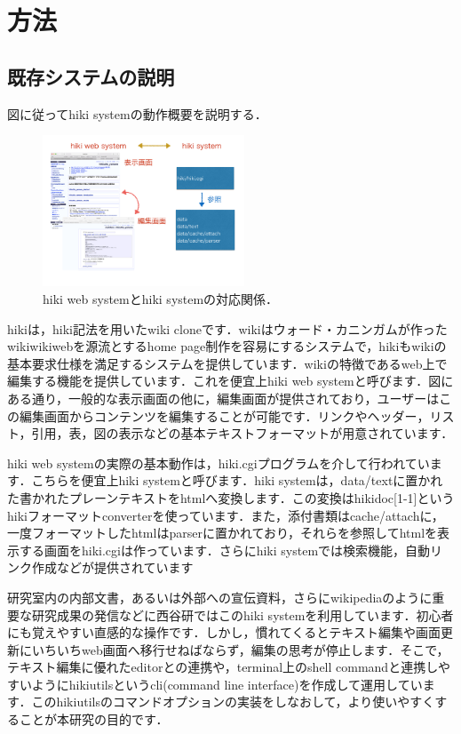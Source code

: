 \section{方法}
\subsection{既存システムの説明}
図に従ってhiki systemの動作概要を説明する．

\begin{figure}[htbp]\begin{center}
\includegraphics[width=6cm,bb=0 0 442 432]{../figs/./hikiutils_yamane_09_copy.001.jpg}
\caption{hiki web systemとhiki systemの対応関係．}
\label{default}\end{center}\end{figure}
hikiは，hiki記法を用いたwiki cloneです．wikiはウォード・カニンガムが作ったwikiwikiwebを源流とするhome page制作を容易にするシステムで，hikiもwikiの基本要求仕様を満足するシステムを提供しています．wikiの特徴であるweb上で編集する機能を提供しています．これを便宜上hiki web systemと呼びます．図にある通り，一般的な表示画面の他に，編集画面が提供されており，ユーザーはこの編集画面からコンテンツを編集することが可能です．リンクやヘッダー，リスト，引用，表，図の表示などの基本テキストフォーマットが用意されています．

hiki web systemの実際の基本動作は，hiki.cgiプログラムを介して行われています．こちらを便宜上hiki systemと呼びます．hiki systemは，data/textに置かれた書かれたプレーンテキストをhtmlへ変換します．この変換はhikidoc[1-1]というhikiフォーマットconverterを使っています．また，添付書類はcache/attachに，一度フォーマットしたhtmlはparserに置かれており，それらを参照してhtmlを表示する画面をhiki.cgiは作っています．さらにhiki systemでは検索機能，自動リンク作成などが提供されています

研究室内の内部文書，あるいは外部への宣伝資料，さらにwikipediaのように重要な研究成果の発信などに西谷研ではこのhiki systemを利用しています．初心者にも覚えやすい直感的な操作です．しかし，慣れてくるとテキスト編集や画面更新にいちいちweb画面へ移行せねばならず，編集の思考が停止します．そこで，テキスト編集に優れたeditorとの連携や，terminal上のshell commandと連携しやすいようにhikiutilsというcli(command line interface)を作成して運用しています．このhikiutilsのコマンドオプションの実装をしなおして，より使いやすくすることが本研究の目的です．

